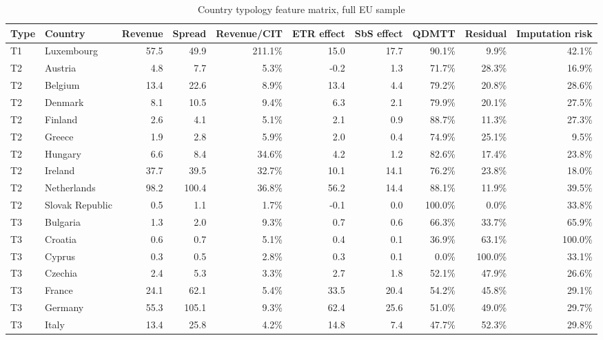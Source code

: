 \begin{table}[H]
\centering
\footnotesize
\setlength{\tabcolsep}{3pt}
\caption{Country typology feature matrix, full EU sample}
\label{tab:app_country_typology_features}
\begin{adjustbox}{max width=\textwidth,center}
\begin{tabular}{@{}llrrrrrrrr@{}}
\toprule
Type & Country & Revenue & Spread & Revenue/CIT & ETR effect & SbS effect & QDMTT & Residual & Imputation risk \\
\midrule
T1 & Luxembourg & 57.5 &  49.9 & 211.1\% & 15.0 & 17.7 &  90.1\% &   9.9\% &  42.1\% \\
T2 & Austria &  4.8 &   7.7 &   5.3\% & -0.2 &  1.3 &  71.7\% &  28.3\% &  16.9\% \\
T2 & Belgium & 13.4 &  22.6 &   8.9\% & 13.4 &  4.4 &  79.2\% &  20.8\% &  28.6\% \\
T2 & Denmark &  8.1 &  10.5 &   9.4\% &  6.3 &  2.1 &  79.9\% &  20.1\% &  27.5\% \\
T2 & Finland &  2.6 &   4.1 &   5.1\% &  2.1 &  0.9 &  88.7\% &  11.3\% &  27.3\% \\
T2 & Greece &  1.9 &   2.8 &   5.9\% &  2.0 &  0.4 &  74.9\% &  25.1\% &   9.5\% \\
T2 & Hungary &  6.6 &   8.4 &  34.6\% &  4.2 &  1.2 &  82.6\% &  17.4\% &  23.8\% \\
T2 & Ireland & 37.7 &  39.5 &  32.7\% & 10.1 & 14.1 &  76.2\% &  23.8\% &  18.0\% \\
T2 & Netherlands & 98.2 & 100.4 &  36.8\% & 56.2 & 14.4 &  88.1\% &  11.9\% &  39.5\% \\
T2 & Slovak Republic &  0.5 &   1.1 &   1.7\% & -0.1 &  0.0 & 100.0\% &   0.0\% &  33.8\% \\
T3 & Bulgaria &  1.3 &   2.0 &   9.3\% &  0.7 &  0.6 &  66.3\% &  33.7\% &  65.9\% \\
T3 & Croatia &  0.6 &   0.7 &   5.1\% &  0.4 &  0.1 &  36.9\% &  63.1\% & 100.0\% \\
T3 & Cyprus &  0.3 &   0.5 &   2.8\% &  0.3 &  0.1 &   0.0\% & 100.0\% &  33.1\% \\
T3 & Czechia &  2.4 &   5.3 &   3.3\% &  2.7 &  1.8 &  52.1\% &  47.9\% &  26.6\% \\
T3 & France & 24.1 &  62.1 &   5.4\% & 33.5 & 20.4 &  54.2\% &  45.8\% &  29.1\% \\
T3 & Germany & 55.3 & 105.1 &   9.3\% & 62.4 & 25.6 &  51.0\% &  49.0\% &  29.7\% \\
T3 & Italy & 13.4 &  25.8 &   4.2\% & 14.8 &  7.4 &  47.7\% &  52.3\% &  29.8\% \\

\end{tabular}
\end{adjustbox}
\end{table}
